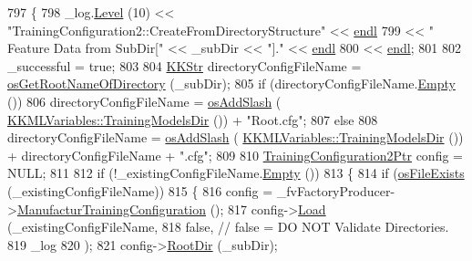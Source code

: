 \begin{DoxyCode}
797 \{
798   \_log.\hyperlink{class_k_k_b_1_1_run_log_a32cf761d7f2e747465fd80533fdbb659}{Level} (10) << \textcolor{stringliteral}{"TrainingConfiguration2::CreateFromDirectoryStructure"}  << 
      \hyperlink{namespace_k_k_b_ad1f50f65af6adc8fa9e6f62d007818a8}{endl}
799                   << \textcolor{stringliteral}{"                       Feature Data from SubDir["} << \_subDir << \textcolor{stringliteral}{"]."} << 
      \hyperlink{namespace_k_k_b_ad1f50f65af6adc8fa9e6f62d007818a8}{endl}
800                   << \hyperlink{namespace_k_k_b_ad1f50f65af6adc8fa9e6f62d007818a8}{endl};
801 
802   \_successful = \textcolor{keyword}{true};
803 
804   \hyperlink{class_k_k_b_1_1_k_k_str}{KKStr}  directoryConfigFileName = \hyperlink{namespace_k_k_b_a456628fbc248c742b076e5f8b2456c98}{osGetRootNameOfDirectory} (\_subDir);
805   \textcolor{keywordflow}{if}  (directoryConfigFileName.\hyperlink{class_k_k_b_1_1_k_k_str_ac69942f73fffd672ec2a6e1c410afdb6}{Empty} ())
806     directoryConfigFileName = \hyperlink{namespace_k_k_b_aa0d40119b911df4283399a1724cab1ef}{osAddSlash} (
      \hyperlink{class_k_k_m_l_l_1_1_k_k_m_l_variables_a5d979a176f5db194a4d9d96634e21ce0}{KKMLVariables::TrainingModelsDir} ()) + \textcolor{stringliteral}{"Root.cfg"};
807   \textcolor{keywordflow}{else}
808     directoryConfigFileName = \hyperlink{namespace_k_k_b_aa0d40119b911df4283399a1724cab1ef}{osAddSlash} (
      \hyperlink{class_k_k_m_l_l_1_1_k_k_m_l_variables_a5d979a176f5db194a4d9d96634e21ce0}{KKMLVariables::TrainingModelsDir} ()) + directoryConfigFileName + \textcolor{stringliteral}{".cfg"};
809 
810   \hyperlink{class_k_k_m_l_l_1_1_training_configuration2}{TrainingConfiguration2Ptr}  config = NULL;
811 
812   \textcolor{keywordflow}{if}  (!\_existingConfigFileName.\hyperlink{class_k_k_b_1_1_k_k_str_ac69942f73fffd672ec2a6e1c410afdb6}{Empty} ())
813   \{
814     \textcolor{keywordflow}{if}  (\hyperlink{namespace_k_k_b_aba5c7fcb492dea01f2115c492ff65d83}{osFileExists} (\_existingConfigFileName))
815     \{
816       config = \_fvFactoryProducer->\hyperlink{class_k_k_m_l_l_1_1_factory_f_v_producer_a3638e312813fd78c2a4ead4fb71e2537}{ManufacturTrainingConfiguration} ();
817       config->\hyperlink{class_k_k_m_l_l_1_1_training_configuration2_a89bb53ad704979d78053e1ae8d1253c6}{Load} (\_existingConfigFileName, 
818                     \textcolor{keyword}{false},  \textcolor{comment}{//  false = DO NOT Validate Directories.}
819                     \_log
820                    );
821       config->\hyperlink{class_k_k_m_l_l_1_1_training_configuration2_a1e3c8e069a8f2894ad4f6abc3efe5559}{RootDir} (\_subDir);

\end{DoxyCode}
